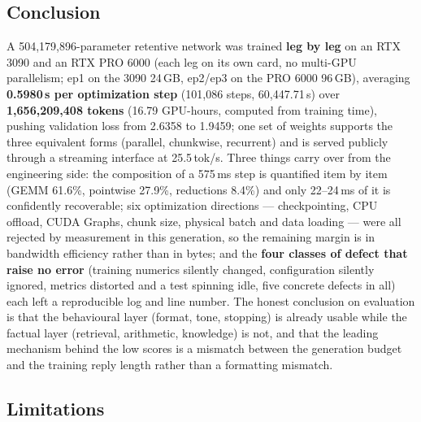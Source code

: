 \documentclass[11pt,openany]{article}
\begin{document}
\subsection{Conclusion}

A 504{,}179{,}896-parameter retentive network was trained \textbf{leg by leg} on an RTX 3090 and an
RTX PRO 6000 (each leg on its own card, no multi-GPU parallelism; ep1 on the 3090 24\,GB, ep2/ep3
on the PRO 6000 96\,GB), averaging \textbf{0.5980\,s per optimization step} (101{,}086 steps,
60{,}447.71\,s) over \textbf{1{,}656{,}209{,}408 tokens} (16.79 GPU-hours,  computed
from training time), pushing validation loss from 2.6358 to 1.9459; one set of weights supports
the three equivalent forms (parallel, chunkwise, recurrent) and is served publicly through a
streaming interface at 25.5\,tok/s. Three things carry over from the engineering side: the
composition of a 575\,ms step is quantified item by item (GEMM 61.6\%, pointwise 27.9\%,
reductions 8.4\%) and only 22--24\,ms of it is confidently recoverable; six optimization
directions --- checkpointing, CPU offload, CUDA Graphs, chunk size, physical batch and data
loading --- were all rejected by measurement in this generation, so the remaining margin is in
bandwidth efficiency rather than in bytes; and the \textbf{four classes of defect that raise no
error} (training numerics silently changed, configuration silently ignored, metrics distorted and
a test spinning idle, five concrete defects in all) each left a reproducible log and line number.
The honest conclusion on evaluation is that the behavioural layer (format, tone, stopping) is
already usable while the factual layer (retrieval, arithmetic, knowledge) is not, and that the
leading mechanism behind the low scores is a mismatch between the generation budget and the
training reply length rather than a formatting mismatch.

\subsection{Limitations}
\end{document}
